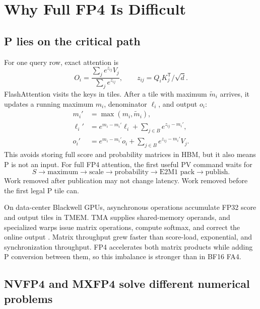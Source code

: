 \section{Why Full FP4 Is Difficult}

\subsection{P lies on the critical path}

For one query row, exact attention is
\begin{equation}
  O_i=\frac{\sum_j e^{z_{ij}}V_j}{\sum_j e^{z_{ij}}},
  \qquad z_{ij}=Q_iK_j^\mathsf{T}/\sqrt d.
  \label{eq:exact-attention}
\end{equation}
FlashAttention visits the keys in tiles. After a tile with maximum
$\widetilde m_i$ arrives, it updates a running maximum $m_i$, denominator
$\ell_i$, and output $o_i$:
\begin{align}
  m_i' &= \max(m_i,\widetilde m_i), \\
  \ell_i' &= e^{m_i-m_i'}\ell_i+
    \sum_{j\in B}e^{z_{ij}-m_i'}, \\
  o_i' &= e^{m_i-m_i'}o_i+
    \sum_{j\in B}e^{z_{ij}-m_i'}V_j.
  \label{eq:online-recurrence}
\end{align}
This avoids storing full score and probability matrices in HBM, but it also
means P is not an input. For full FP4 attention, the first useful PV command
waits for
\begin{equation}
  S\rightarrow\text{maximum}\rightarrow\text{scale}
  \rightarrow\text{probability}\rightarrow\text{E2M1 pack}
  \rightarrow\text{publish}.
  \label{eq:serial-p-path}
\end{equation}
Work removed after publication may not change latency. Work removed before
the first legal P tile can.

On data-center Blackwell GPUs, asynchronous \tcgen{} operations accumulate
FP32 score and output tiles in TMEM. TMA supplies shared-memory operands, and
specialized warps issue matrix operations, compute softmax, and correct the
online output \cite{nvidia2026ptx,zadouri2026flashattention4}. Matrix
throughput grew faster than score-load, exponential, and synchronization
throughput. FP4 accelerates both matrix products while adding P conversion
between them, so this imbalance is stronger than in BF16 FA4.

\subsection{NVFP4 and MXFP4 solve different numerical problems}

